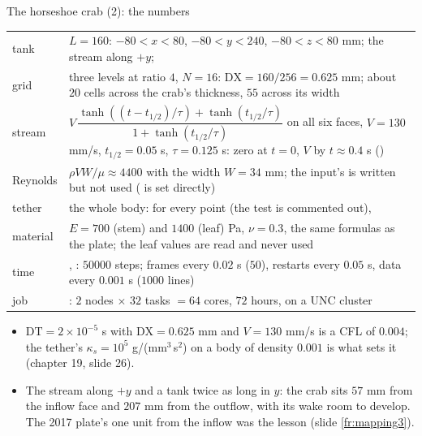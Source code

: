 \documentclass[aspectratio=169,11pt]{beamer}
\begin{document}
\begin{frame}{The horseshoe crab (2): the numbers}
\label{fr:crab2}
\scriptsize
\begin{tabular}{@{}L{0.14\textwidth}L{0.8\textwidth}@{}}
\toprule
tank & $L = 160$: $-80 < x < 80$, $-80 < y < 240$, $-80 < z < 80$ mm; the stream along $+y$;  \\
grid & three levels at ratio $4$, $N = 16$: $\mathrm{DX} = 160/256 = 0.625$ mm; about $20$ cells across the crab's thickness, $55$ across its width \\
stream & $V\,\dfrac{\tanh((t - t_{1/2})/\tau) + \tanh(t_{1/2}/\tau)}{1 + \tanh(t_{1/2}/\tau)}$ on all six faces, $V = 130$ mm/s, $t_{1/2} = 0.05$ s, $\tau = 0.125$ s: zero at $t = 0$, $V$ by $t \approx 0.4$ s () \\
Reynolds & $\rho V W/\mu \approx 4400$ with the width $W = 34$ mm; the input's  is written but not used ( is set directly) \\
tether & the whole body:  for every point (the test  is commented out),  \\
material & $E = 700$ (stem) and $1400$ (leaf) Pa, $\nu = 0.3$, the same formulas as the plate; the leaf values are read and never used \\
time & , : $50000$ steps; frames every $0.02$ s ($50$), restarts every $0.05$ s, data every $0.001$ s ($1000$ lines) \\
job & : $2$ nodes $\times$ $32$ tasks $= 64$ cores, $72$ hours, on a UNC cluster \\
\bottomrule
\end{tabular}

\medskip
\begin{itemize}
  \item $\mathrm{DT} = 2\times10^{-5}$ s with $\mathrm{DX} = 0.625$ mm and $V = 130$ mm/s is a CFL of $0.004$; the tether's $\kappa_s = 10^5$ g/(mm$^3$\,s$^2$) on a body of density $0.001$ is what sets it (chapter 19, slide 26).
  \item The stream along $+y$ and a tank twice as long in $y$: the crab sits $57$ mm from the inflow face and $207$ mm from the outflow, with its wake room to develop. The 2017 plate's one unit from the inflow was the lesson (slide \ref{fr:mapping3}).
\end{itemize}
\end{frame}
\end{document}
